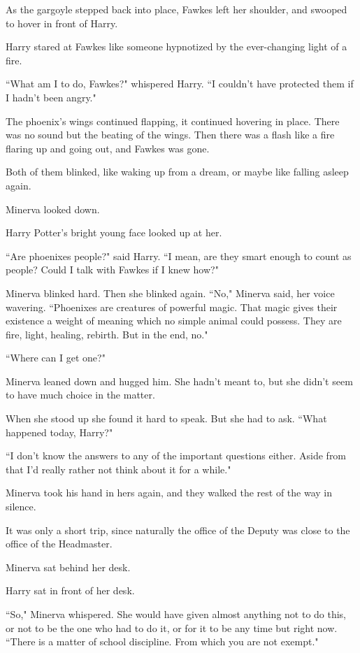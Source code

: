 As the gargoyle stepped back into place, Fawkes left her shoulder, and swooped to hover in front of Harry.

Harry stared at Fawkes like someone hypnotized by the ever-changing light of a fire.

``What am I to do, Fawkes?" whispered Harry. ``I couldn't have protected them if I hadn't been angry."

The phoenix's wings continued flapping, it continued hovering in place. There was no sound but the beating of the wings. Then there was a flash like a fire flaring up and going out, and Fawkes was gone.

Both of them blinked, like waking up from a dream, or maybe like falling asleep again.

Minerva looked down.

Harry Potter's bright young face looked up at her.

``Are phoenixes people?" said Harry. ``I mean, are they smart enough to count as people? Could I talk with Fawkes if I knew how?"

Minerva blinked hard. Then she blinked again. ``No," Minerva said, her voice wavering. ``Phoenixes are creatures of powerful magic. That magic gives their existence a weight of meaning which no simple animal could possess. They are fire, light, healing, rebirth. But in the end, no."

``Where can I get one?"

Minerva leaned down and hugged him. She hadn't meant to, but she didn't seem to have much choice in the matter.

When she stood up she found it hard to speak. But she had to ask. ``What happened today, Harry?"

``I don't know the answers to any of the important questions either. Aside from that I'd really rather not think about it for a while."

Minerva took his hand in hers again, and they walked the rest of the way in silence.

It was only a short trip, since naturally the office of the Deputy was close to the office of the Headmaster.

Minerva sat behind her desk.

Harry sat in front of her desk.

``So," Minerva whispered. She would have given almost anything not to do this, or not to be the one who had to do it, or for it to be any time but right now. ``There is a matter of school discipline. From which you are not exempt."

